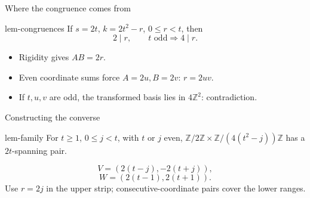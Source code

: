 \documentclass{beamer}
\begin{document}
\begin{frame}{Where the congruence comes from}
\begin{bookresult}{lem-congruences}
If $s=2t$, $k=2t^2-r$, $0\le r<t$, then
\[2\mid r,\qquad t\text{ odd}\Longrightarrow4\mid r.\]
\end{bookresult}
\begin{itemize}
\item Rigidity gives $AB=2r$.
\item Even coordinate sums force $A=2u,B=2v$: $r=2uv$.
\item If $t,u,v$ are odd, the transformed basis lies in $4\mathbb Z^2$: contradiction.
\end{itemize}
\end{frame}
\begin{frame}{Constructing the converse}
\begin{bookresult}{lem-family}
For $t\ge1$, $0\le j<t$, with $t$ or $j$ even,
$\mathbb Z/2\mathbb Z\times\mathbb Z/(4(t^2-j))\mathbb Z$
has a $2t$-spanning pair.
\end{bookresult}
\[V=(2(t-j),-2(t+j)),\]
\[W=(2(t-1),2(t+1)).\]
Use $r=2j$ in the upper strip; consecutive-coordinate pairs cover the lower ranges.
\end{frame}
\end{document}
